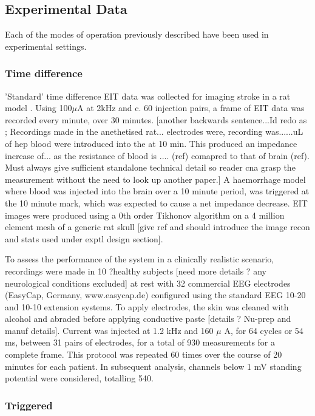 \subsection{Experimental Data}

Each of the modes of operation previously described have been used in experimental settings. 

\subsubsection{Time difference}
\label{methodsTD}
'Standard' time difference EIT data was collected for imaging stroke in a rat model \cite{Dowrick_2016}. Using 100\( \mu \)A at 2kHz and c. 60 injection pairs, a frame of EIT data was recorded every minute, over 30 minutes. [another backwards sentence...Id redo as ; Recordings made in the anethetised rat... electrodes were, recording was......uL of hep blood were introduced into the at 10 min. This produced an impedance increase of... as the resistance of blood is .... (ref) comapred to that of brain (ref). Must always give sufficient standalone technical detail so reader cna grasp the measurement without the need to look up another paper.] A haemorrhage model where blood was injected into the brain over a 10 minute period, was triggered at the 10 minute mark, which was expected to cause a net impedance decrease. EIT images were produced using a 0th order Tikhonov algorithm on a 4 million element mesh of a generic rat skull [give ref and should introduce the image recon and stats used under exptl design section].

To assess the performance of the system in a clinically realistic scenario, recordings were made in 10 ?healthy subjects [need more details ? any neurological conditions excluded] at rest with 32 commercial EEG electrodes (EasyCap, Germany, www.easycap.de) configured using the standard EEG 10-20 \cite{Jasper1958} and 10-10 extension \cite{Oostenveld2001} systems. To apply electrodes, the skin was cleaned with alcohol and abraded before applying conductive paste [details ? Nu-prep and manuf details]. Current was injected at 1.2 kHz and 160 $\mu$ A, for 64 cycles or 54 ms, between 31 pairs of electrodes, for a total of 930 measurements for a complete frame. This protocol was repeated 60 times over the course of 20 minutes for each patient. In subsequent analysis, channels below 1 mV standing potential were considered, totalling 540. 

\subsubsection{Triggered}

